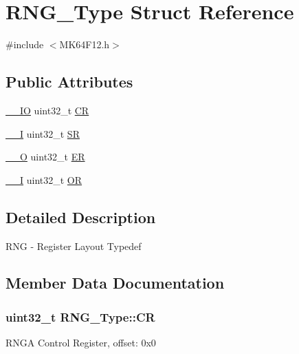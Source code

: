 \hypertarget{structRNG__Type}{}\section{R\+N\+G\+\_\+\+Type Struct Reference}
\label{structRNG__Type}


{\ttfamily \#include $<$M\+K64\+F12.\+h$>$}

\subsection*{Public Attributes}
\begin{DoxyCompactItemize}
\item 
\hyperlink{core__sc300_8h_aec43007d9998a0a0e01faede4133d6be}{\+\_\+\+\_\+\+IO} uint32\+\_\+t \hyperlink{structRNG__Type_aa271d09399fb6530e40ff9814f9f4d79}{CR}
\item 
\hyperlink{core__sc300_8h_af63697ed9952cc71e1225efe205f6cd3}{\+\_\+\+\_\+I} uint32\+\_\+t \hyperlink{structRNG__Type_a4d72ce4858cff5da811b489b0f3d41a8}{SR}
\item 
\hyperlink{core__sc300_8h_a7e25d9380f9ef903923964322e71f2f6}{\+\_\+\+\_\+O} uint32\+\_\+t \hyperlink{structRNG__Type_a40849dd4f2a671fe31d55046aff91cd6}{ER}
\item 
\hyperlink{core__sc300_8h_af63697ed9952cc71e1225efe205f6cd3}{\+\_\+\+\_\+I} uint32\+\_\+t \hyperlink{structRNG__Type_ad59205cea4b6417e6cae229001ab24d4}{OR}
\end{DoxyCompactItemize}


\subsection{Detailed Description}
R\+NG -\/ Register Layout Typedef 

\subsection{Member Data Documentation}
\subsubsection[{\texorpdfstring{CR}{CR}}]{ uint32\+\_\+t R\+N\+G\+\_\+\+Type\+::\+CR}\hypertarget{structRNG__Type_aa271d09399fb6530e40ff9814f9f4d79}{}\label{structRNG__Type_aa271d09399fb6530e40ff9814f9f4d79}
R\+N\+GA Control Register, offset\+: 0x0 
